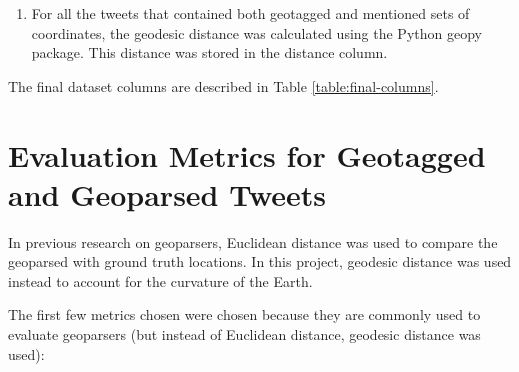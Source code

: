 \begin{enumerate}
    \item For all the tweets that contained both geotagged and mentioned sets of coordinates, the geodesic distance was calculated using the Python {\selectfont geopy} package. This distance was stored in the {\selectfont distance column}.
\end{enumerate}

The final dataset columns are described in Table \ref{table:final-columns}. 

    
\section{Evaluation Metrics for Geotagged and Geoparsed Tweets}

In previous research on geoparsers, Euclidean distance was used to compare the geoparsed with ground truth locations. In this project, geodesic distance was used instead to account for the curvature of the Earth.

The first few metrics chosen were chosen because they are commonly used to evaluate geoparsers (but instead of Euclidean distance, geodesic distance was used):

